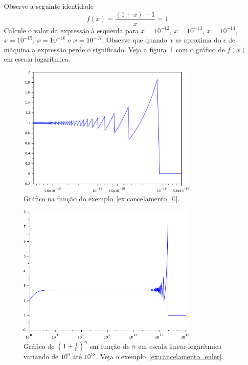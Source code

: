 \begin{ex}\label{ex:cancelamento_0}Observe a seguinte identidade
$$
f(x)=\frac{(1+x)-1}{x}=1
$$
Calcule o valor da expressão à esquerda para $x=10^{-12}$, $x=10^{-13}$, $x=10^{-14}$, $x=10^{-15}$, $x=10^{-16}$ e $x=10^{-17}$. Observe que quando $x$ se aproxima do $\epsilon$ de máquina a expressão perde o significado. Veja a figura~\ref{fig:cancelamento_0} com o gráfico de $f(x)$ em escala logarítmica.
\end{ex}

\begin{figure}
  \centering
  \includegraphics[width=0.8\textwidth]{./cap_aritmetica/pics/cancelamento_0}  
  \caption{Gráfico na função do exemplo~\ref{ex:cancelamento_0}.}
  \label{fig:cancelamento_0}
\end{figure}


\begin{figure}
  \includegraphics[width=0.8\textwidth]{./cap_aritmetica/pics/cancelamento_euler}
  \caption{Gráfico de $\left(1+\frac{1}{n}\right)^n$ em função de $n$ em escala linear-logarítmica variando de $10^0$ até $10^{18}$. Veja o exemplo~\ref{ex:cancelamento_euler}.}
  \label{fig:cancelamento_euler}
\end{figure}

